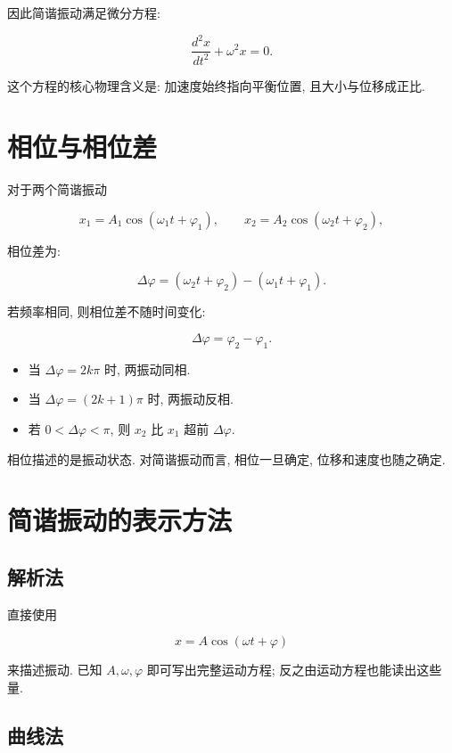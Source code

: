 \documentclass[
  a4paper,
]{ctexrep}
\providecommand{\tightlist}{%
  \setlength{\itemsep}{0pt}\setlength{\parskip}{0pt}}
\begin{document}
因此简谐振动满足微分方程:

\[
\frac{d^2x}{dt^2}+\omega^2x=0.
\]

这个方程的核心物理含义是: 加速度始终指向平衡位置, 且大小与位移成正比.

\section{相位与相位差}\label{ux76f8ux4f4dux4e0eux76f8ux4f4dux5dee}

对于两个简谐振动

\[
x_1=A_1\cos(\omega_1t+\varphi_1),\qquad
x_2=A_2\cos(\omega_2t+\varphi_2),
\]

相位差为:

\[
\Delta\varphi=(\omega_2t+\varphi_2)-(\omega_1t+\varphi_1).
\]

若频率相同, 则相位差不随时间变化:

\[
\Delta\varphi=\varphi_2-\varphi_1.
\]

\begin{itemize}
\tightlist
\item
  当 \(\Delta\varphi=2k\pi\) 时, 两振动同相.
\item
  当 \(\Delta\varphi=(2k+1)\pi\) 时, 两振动反相.
\item
  若 \(0<\Delta\varphi<\pi\), 则 \(x_2\) 比 \(x_1\) 超前
  \(\Delta\varphi\).
\end{itemize}

相位描述的是振动状态. 对简谐振动而言, 相位一旦确定,
位移和速度也随之确定.

\section{简谐振动的表示方法}\label{ux7b80ux8c10ux632fux52a8ux7684ux8868ux793aux65b9ux6cd5}

\subsection{解析法}\label{ux89e3ux6790ux6cd5}

直接使用

\[
x=A\cos(\omega t+\varphi)
\]

来描述振动. 已知 \(A,\omega,\varphi\) 即可写出完整运动方程;
反之由运动方程也能读出这些量.

\subsection{曲线法}\label{ux66f2ux7ebfux6cd5}
\end{document}

